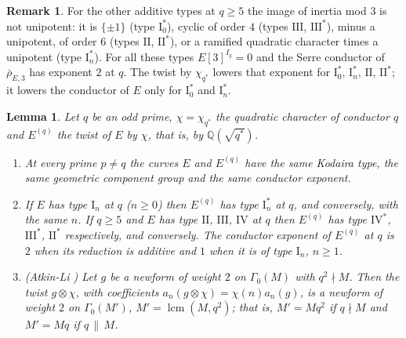\documentclass[11pt]{amsart}
\newtheorem{lemma}[theorem]{Lemma}
\theoremstyle{definition}
\newtheorem{remark}[theorem]{Remark}
\newcommand{\Q}{\mathbb{Q}}
\begin{document}
\begin{remark}\label{rem:types}
For the other additive types at $q\ge5$ the image of inertia mod $3$ is not unipotent: it is $\{\pm1\}$ (type $\mathrm{I}_0^*$), cyclic of order $4$ (types $\mathrm{III}$, $\mathrm{III}^*$), minus a unipotent, of order $6$ (types $\mathrm{II}$, $\mathrm{II}^*$), or a ramified quadratic character times a unipotent (type $\mathrm{I}_n^*$). For all these types $E[3]^{I_q}=0$ and the Serre conductor of $\bar\rho_{E,3}$ has exponent $2$ at $q$. The twist by $\chi_{q^*}$ lowers that exponent for $\mathrm{I}_0^*$, $\mathrm{I}_n^*$, $\mathrm{II}$, $\mathrm{II}^*$; it lowers the conductor of $E$ only for $\mathrm{I}_0^*$ and $\mathrm{I}_n^*$.
\end{remark}

\begin{lemma}\label{lem:twist}
Let $q$ be an odd prime, $\chi=\chi_{q^*}$ the quadratic character of conductor $q$ and $E^{(q)}$ the twist of $E$ by $\chi$, that is, by $\Q(\sqrt{q^*})$.
\begin{enumerate}
\item[(i)] At every prime $p\ne q$ the curves $E$ and $E^{(q)}$ have the same Kodaira type, the same geometric component group and the same conductor exponent.
\item[(ii)] If $E$ has type $\mathrm{I}_n$ at $q$ ($n\ge0$) then $E^{(q)}$ has type $\mathrm{I}_n^*$ at $q$, and conversely, with the same $n$. If $q\ge5$ and $E$ has type $\mathrm{II}$, $\mathrm{III}$, $\mathrm{IV}$ at $q$ then $E^{(q)}$ has type $\mathrm{IV}^*$, $\mathrm{III}^*$, $\mathrm{II}^*$ respectively, and conversely. The conductor exponent of $E^{(q)}$ at $q$ is $2$ when its reduction is additive and $1$ when it is of type $\mathrm{I}_n$, $n\ge1$.
\item[(iii)] (Atkin-Li \cite{AtkinLi78}) Let $g$ be a newform of weight $2$ on $\Gamma_0(M)$ with $q^2\nmid M$. Then the twist $g\otimes\chi$, with coefficients $a_n(g\otimes\chi)=\chi(n)a_n(g)$, is a newform of weight $2$ on $\Gamma_0(M')$, $M'=\operatorname{lcm}(M,q^2)$; that is, $M'=Mq^2$ if $q\nmid M$ and $M'=Mq$ if $q\,\|\,M$.
\end{enumerate}
\end{lemma}
\end{document}
